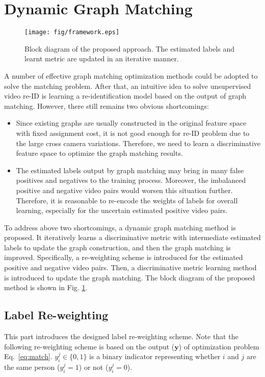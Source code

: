 \documentclass[10pt,twocolumn,letterpaper]{article}
\begin{document}
\section{Dynamic Graph Matching}\label{sec:metric}
\begin{figure}[t]
  \centering
  \texttt{[image: fig/framework.eps]}\\
  \caption{\small{Block diagram of the proposed approach. The estimated labels and learnt metric are updated in an iterative manner. }}\label{fig:frame}
\end{figure}
A number of effective graph matching optimization methods could be adopted to solve the matching problem. After that, an intuitive idea to solve unsupervised video re-ID is learning a re-identification model based on the output of graph matching. However, there still remains two obvious shortcomings:
 \begin{itemize}
\item Since existing graphs are usually constructed in the original feature space with fixed assignment cost, it is not good enough for re-ID problem due to the large cross camera variations. Therefore, we need to learn a discriminative feature space to optimize the graph matching results.
\item The estimated labels output by graph matching may bring in many false positives and negatives to the training process. Moreover, the imbalanced positive and negative video pairs would worsen this situation further. Therefore, it is reasonable to re-encode the weights of labels for overall learning, especially for the uncertain estimated positive video pairs.
 \end{itemize}
To address above two shortcomings, a dynamic graph matching method is proposed. It iteratively learns a discriminative metric with intermediate estimated labels to update the graph construction, and then the graph matching is improved. Specifically, a re-weighting scheme is introduced for the estimated positive and negative video pairs. Then, a discriminative metric learning method is introduced to update the graph matching. The block diagram of the proposed method is shown in Fig. \ref{fig:frame}.
\subsection{Label Re-weighting}
This part introduces the designed label re-weighting scheme. Note that the following re-weighting scheme is based on the output ($\mathbf{y}$) of optimization problem Eq.~\ref{eq:match}. $y_i^j \in \{0,1\}$ is a binary indicator representing whether $i$ and $j$ are the same person ($y_i^j =1$) or not ($y_i^j =0$).
\end{document}
